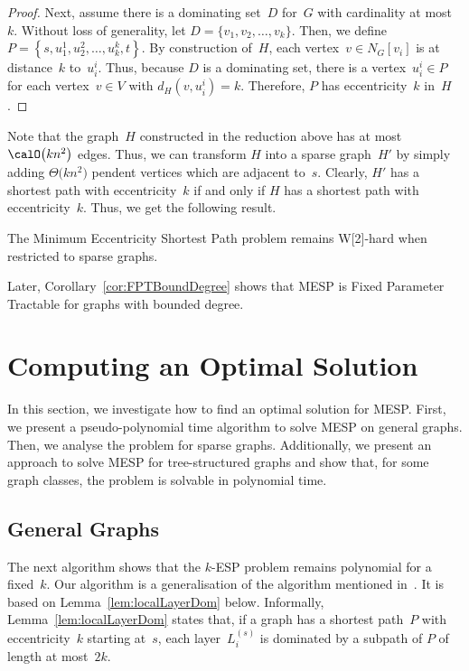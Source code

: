 \begin{proof}
Next, assume there is a dominating set~$D$ for~$G$ with cardinality at most~$k$.
Without loss of generality, let $D = \big \{ v_1, v_2, \ldots, v_k \big \}$.
Then, we define $P = \left \{ s, u^1_1, u^2_2, \ldots, u_k^k, t \right \}$.
By construction of~$H$, each vertex~$v \in N_G[v_i]$ is at distance~$k$ to~$u_i^i$.
Thus, because $D$ is a dominating set, there is a vertex~$u_i^i \in P$ for each vertex~$v \in V$ with $d_H \! \left( v, u_i^i \right) = k$.
Therefore, $P$ has eccentricity~$k$ in~$H$.
\end{proof}

Note that the graph~$H$ constructed in the reduction above has at most $\calO \big( kn^2 \big)$ edges.
Thus, we can transform $H$ into a sparse graph~$H'$ by simply adding $\Theta \big( kn^2 \big)$ pendent vertices which are adjacent to~$s$.
Clearly, $H'$ has a shortest path with eccentricity~$k$ if and only if $H$ has a shortest path with eccentricity~$k$.
Thus, we get the following result.

\begin{corollary}
    \label{cor:mespW2Sparse}
The Minimum Eccentricity Shortest Path problem remains W[2]-hard when restricted to sparse graphs.
\end{corollary}

Later, Corollary~\ref{cor:FPTBoundDegree} shows that MESP is Fixed Parameter Tractable for graphs with bounded degree.

\section{Computing an Optimal Solution}
    \label{sec:mesp_OptSol}

In this section, we investigate how to find an optimal solution for MESP.
First, we present a pseudo-polynomial time algorithm to solve MESP on general graphs.
Then, we analyse the problem for sparse graphs.
Additionally, we present an approach to solve MESP for tree-structured graphs and show that, for some graph classes, the problem is solvable in polynomial time.

\subsection{General Graphs}

The next algorithm shows that the $k$-ESP problem remains polynomial for a fixed~$k$.
Our algorithm is a generalisation of the algorithm mentioned in~\cite{Kratsch2000}.
It is based on Lemma~\ref{lem:localLayerDom} below.
Informally, Lemma~\ref{lem:localLayerDom} states that, if a graph has a shortest path~$P$ with eccentricity~$k$ starting at~$s$, each layer~$L_i^{(s)}$ is dominated by a subpath of $P$ of length at most~$2k$.


